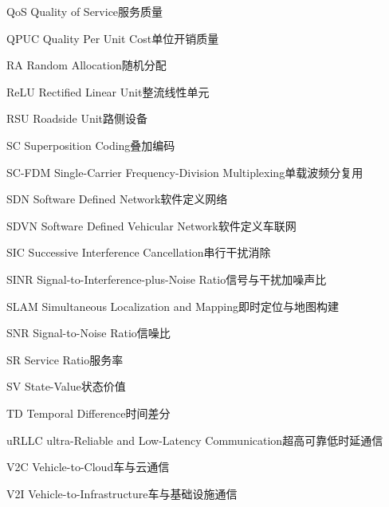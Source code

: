 \begin{abbreviate}[0mm][18mm]
\item[QoS] Quality of Service\hspace{1em}服务质量
\item[QPUC] Quality Per Unit Cost\hspace{1em}单位开销质量
\item[RA] Random Allocation\hspace{1em}随机分配
\item[ReLU] Rectified Linear Unit\hspace{1em}整流线性单元
\item[RSU] Roadside Unit\hspace{1em}路侧设备
\item[SC] Superposition Coding\hspace{1em}叠加编码
\item[SC-FDM] Single-Carrier Frequency-Division Multiplexing\hspace{1em}单载波频分复用
\item[SDN] Software Defined Network\hspace{1em}软件定义网络
\item[SDVN] Software Defined Vehicular Network\hspace{1em}软件定义车联网
\item[SIC] Successive Interference Cancellation\hspace{1em}串行干扰消除
\item[SINR] Signal-to-Interference-plus-Noise Ratio\hspace{1em}信号与干扰加噪声比
\item[SLAM] Simultaneous Localization and Mapping\hspace{1em}即时定位与地图构建
\item[SNR] Signal-to-Noise Ratio\hspace{1em}信噪比
\item[SR] Service Ratio\hspace{1em}服务率
\item[SV] State-Value\hspace{1em}状态价值
\item[TD] Temporal Difference\hspace{1em}时间差分
\item[uRLLC] ultra-Reliable and Low-Latency Communication\hspace{1em}超高可靠低时延通信
\item[V2C] Vehicle-to-Cloud\hspace{1em}车与云通信
\item[V2I] Vehicle-to-Infrastructure\hspace{1em}车与基础设施通信

\end{abbreviate}
